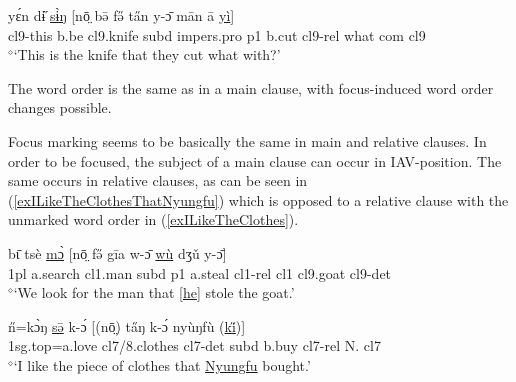 \documentclass[10pt,twoside]{article}
\newcommand{\gl}[1]{`#1'}
\def\VSP{\vspace{0pt}}
\newcommand{\cl}[1]{{\sc cl#1}}
\newcommand{\pref}[1]{(\ref{#1})}
\def\elicited{$^\diamond$}
\def\ih{ɩ}
\begin{document}
\begin{exe}
	\ex \label{exTheKnifeTheyCutWhat}	

		\gll yɛ́n dɨ̋ \uline{sɨ̀ŋ} [nō̤ bə̄ fə̋ ta̋n y-ɔ̄ mān ā \uline{yì}]		\\
		\cl9-this b.be \cl9.knife {\sc subd} {\sc impers.pro} {\sc p1} b.cut \cl9-{\sc rel} what {\sc com} \cl9 	\\
		\glt \VSP \elicited \gl{This is the knife that they cut what with?}

\end{exe}%

The word order is the same as in a main clause, with focus-induced word order
changes possible.

Focus marking seems to be basically the same in main and relative clauses. In order to be focused, 
the subject of a main clause can occur in IAV-position. The same occurs in relative clauses, as can be 
seen in \pref{exILikeTheClothesThatNyungfu} which is opposed to a relative clause with the unmarked 
word order in \pref{exILikeTheClothes}.

\begin{exe}
	\ex \label{exWeLookFor}	

		\gll 	b{\=\ih} tsè \uline{mɔ̀} [nō̤ fə̋ gīa w-ɔ̄ \uline{wù} dʒǔ y-ɔ̄]		\\
			1{\sc pl} a.search \cl1.man {\sc subd} {\sc p1} a.steal \cl1-{\sc rel} \cl1  \cl9.goat \cl9-{\sc det}\\
		\glt \VSP \elicited \gl{We look for the man that [\uline{he}] stole the goat.}
		
\end{exe}%

\begin{exe}
	\ex \label{exILikeTheClothesThatNyungfu}	

		\gll n̋=kɔ̀ŋ \uline{sə̄} k-ɔ́ [(nō̤) ta̋ŋ k-ɔ́ nyùŋfù (\uline{ki̋})]			\\
		{\sc 1sg.top}=a.love \cl7/8.clothes \cl7-{\sc det} {\sc subd} b.buy \cl7-{\sc rel} N. \cl7 	\\
		\glt \VSP \elicited \gl{I like the piece of clothes that \uline{Nyungfu} bought.}
		
\end{exe}%
\end{document}
